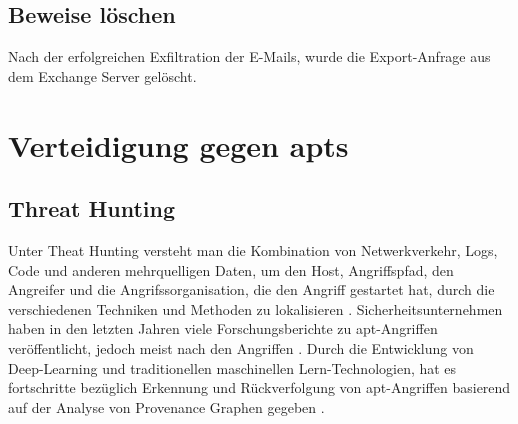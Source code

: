 \documentclass[conference]{IEEEtran}
\begin{document}
\subsection{Beweise löschen}
Nach der erfolgreichen Exfiltration der E-Mails, wurde die Export-Anfrage aus dem Exchange Server gelöscht.

\section{Verteidigung gegen \aclp{apt}}
\subsection{Threat Hunting}
Unter Theat Hunting versteht man die Kombination von Netwerkverkehr, Logs, Code und anderen mehrquelligen Daten, um den Host, Angriffspfad, den Angreifer und die Angrifssorganisation, die den Angriff gestartet hat, durch die verschiedenen Techniken und Methoden zu lokalisieren \cite{Chen2022}.
Sicherheitsunternehmen haben in den letzten Jahren viele Forschungsberichte zu \ac{apt}-Angriffen veröffentlicht, jedoch meist nach den Angriffen \cite{Chen2022}.
Durch die Entwicklung von Deep-Learning und traditionellen maschinellen Lern-Technologien, hat es fortschritte bezüglich Erkennung und Rückverfolgung von \ac{apt}-Angriffen basierend auf der Analyse von Provenance Graphen gegeben \cite{Chen2022}.
\end{document}
